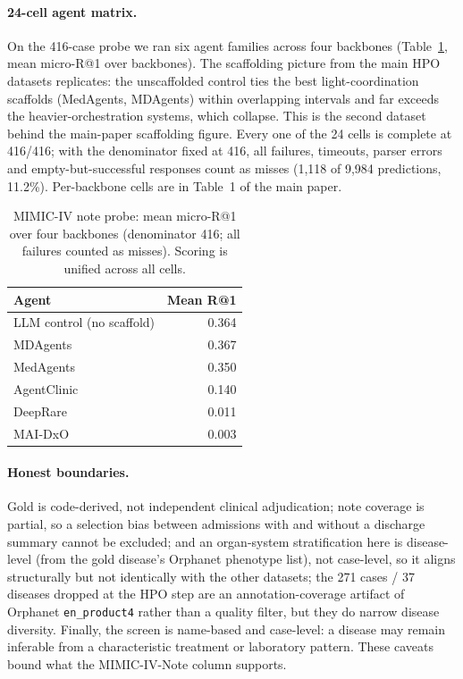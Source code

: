 \documentclass[letterpaper]{article} %
\begin{document}
\paragraph{24-cell agent matrix.}
On the 416-case probe we ran six agent families across four backbones
(Table~\ref{tab:mimicmatrix}, mean micro-R@1 over backbones). The scaffolding
picture from the main HPO datasets replicates: the unscaffolded control ties the
best light-coordination scaffolds (MedAgents, MDAgents) within overlapping
intervals and far exceeds the heavier-orchestration systems, which collapse.
This is the second dataset behind the main-paper scaffolding figure. Every one of
the 24 cells is complete at 416/416; with the denominator fixed at 416, all
failures, timeouts, parser errors and empty-but-successful responses count as
misses (1,118 of 9,984 predictions, 11.2\%). Per-backbone cells are in Table~1 of
the main paper.

\begin{table}[h]
\centering
\scriptsize
\setlength{\tabcolsep}{5pt}
\caption{MIMIC-IV note probe: mean micro-R@1 over four backbones
(denominator 416; all failures counted as misses). Scoring is unified across
all cells.}
\label{tab:mimicmatrix}
\begin{tabular}{@{}lr@{}}
\toprule
Agent & Mean R@1 \\
\midrule
LLM control (no scaffold) & 0.364 \\
MDAgents & 0.367 \\
MedAgents & 0.350 \\
AgentClinic & 0.140 \\
DeepRare & 0.011 \\
MAI-DxO & 0.003 \\
\bottomrule
\end{tabular}
\end{table}

\paragraph{Honest boundaries.}
Gold is code-derived, not independent clinical adjudication; note coverage is
partial, so a selection bias between admissions with and without a discharge
summary cannot be excluded; and an organ-system stratification here is
disease-level (from the gold disease's Orphanet phenotype list), not
case-level, so it aligns structurally but not identically with the other
datasets; the 271 cases / 37 diseases dropped at the HPO step are an
annotation-coverage artifact of Orphanet \texttt{en\_product4} rather than a
quality filter, but they do narrow disease diversity. Finally, the screen is
name-based and case-level: a disease may remain inferable from a characteristic
treatment or laboratory pattern. These caveats bound what the MIMIC-IV-Note column
supports.
\end{document}
